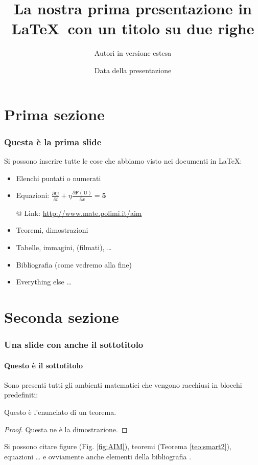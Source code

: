 \documentclass[leqno]{beamer}
\title[La nostra prima presentazione in \LaTeX\ ]{La nostra prima presentazione in \LaTeX\ con un titolo su due righe}
\author[Autori sintetici]{Autori in versione estesa}
\date{Data della presentazione}
\institute[Polimi]{Politecnico di Milano}
\begin{document}
\begin{frame}
\titlepage
\end{frame}

\section{Prima sezione}
\begin{frame}
    \frametitle{Questa \`e la prima slide}

    Si possono inserire tutte le cose che abbiamo visto nei documenti in \LaTeX:

    \begin{itemize}[<+->]
     \item Elenchi puntati o numerati
     \item Equazioni: $\frac{\partial \mathbf{U}}{\partial t} + \eta \frac{\partial \mathbf{F}(\mathbf{U})}{\partial x} = \mathbf{5}$
     \item[@] Link: \url{http://www.mate.polimi.it/aim}
     \item Teoremi, dimostrazioni
     \item Tabelle, immagini, (filmati), \ldots
     \item Bibliografia (come vedremo alla fine)
     \item Everything else \ldots
    \end{itemize}


\end{frame}


\section{Seconda sezione}

\begin{frame}
    \frametitle{Una slide con anche il sottotitolo}
      \framesubtitle{Questo \`e il sottotitolo}

    Sono presenti tutti gli ambienti matematici che vengono racchiusi in blocchi predefiniti:

    \begin{theorem}
    \label{teo:smart2}
    Questo \`e l'enunciato di un teorema.
    
    \end{theorem}
\begin{proof}
    Questa ne \`e la dimostrazione.
    \end{proof}
    Si possono citare figure (Fig. \ref{fig:AIM}), teoremi (Teorema \ref{teo:smart2}), equazioni \ldots
    e ovviamente anche elementi della bibliografia \cite{artelatex}.

\end{frame}
\end{document}
